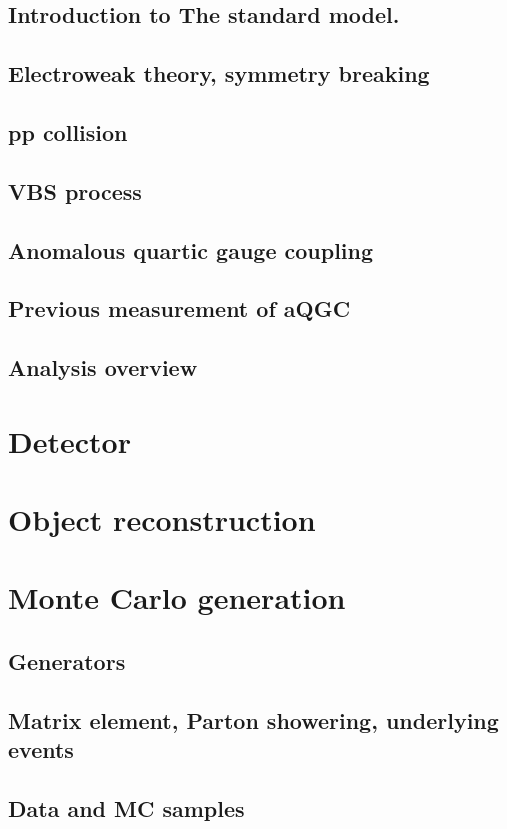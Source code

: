 \documentclass[12pt]{article}
\begin{document}
\subsection{Introduction to The standard model.}
\subsection{Electroweak theory, symmetry breaking}
\subsection{pp collision}
\subsection{VBS process}
\subsection{Anomalous quartic gauge coupling}
\subsection{Previous measurement of aQGC}
\subsection{Analysis overview}
\section{Detector}
%
\section{Object reconstruction}



\section{Monte Carlo generation}
\subsection{Generators}
\subsection{Matrix element, Parton showering, underlying events}
\subsection{Data and MC samples}
\end{document}
